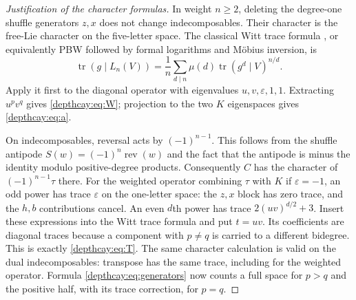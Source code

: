 \documentclass[11pt,a4paper]{article}
\numberwithin{equation}{section}
\theoremstyle{definition}
\theoremstyle{remark}
\begin{document}
\begin{proof}[Justification of the character formulas]
In weight $n\ge2$, deleting the degree-one shuffle generators $z,x$
does not change indecomposables. Their character is the free-Lie
character on the five-letter space. The classical Witt trace formula
\cite{depth:Reutenauer}, or equivalently PBW followed by formal logarithms
and M\"obius inversion, is
\[
 \operatorname{tr}(g\mid L_n(V))
 =\frac1n\sum_{d\mid n}\mu(d)
       \operatorname{tr}(g^d\mid V)^{n/d}.
\]
Apply it first to the diagonal operator with eigenvalues
$u,v,\varepsilon,1,1$. Extracting $u^pv^q$ gives
\eqref{depthcay:eq:W}; projection to the two $K$ eigenspaces gives
\eqref{depthcay:eq:a}.

On indecomposables, reversal acts by $(-1)^{n-1}$. This follows from
the shuffle antipode $S(w)=(-1)^n\operatorname{rev}(w)$ and the fact
that the antipode is minus the identity modulo positive-degree products.
Consequently $C$ has the character of $(-1)^{n-1}\tau$ there.
For the weighted operator combining $\tau$ with $K$ if
$\varepsilon=-1$, an odd power has trace $\varepsilon$ on the
one-letter space: the $z,x$ block has zero trace, and the $h,b$
contributions cancel. An even $d$th power has trace
$2(uv)^{d/2}+3$. Insert these expressions into the Witt trace formula
and put $t=uv$. Its coefficients are diagonal traces because a component
with $p\ne q$ is carried to a different bidegree. This is exactly
\eqref{depthcay:eq:T}. The same character calculation is valid on
the dual indecomposables: transpose has the same trace, including for
the weighted operator. Formula \eqref{depthcay:eq:generators} now
counts a full space for $p>q$ and the positive half, with its trace
correction, for $p=q$.
\end{proof}
\end{document}
